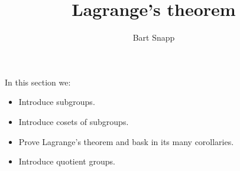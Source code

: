 \documentclass{ximera}
\author{Bart Snapp}
\title{Lagrange's theorem}
\begin{document}
\begin{abstract}
\end{abstract}
\maketitle
In this section we:

\begin{itemize}
\item Introduce subgroups.
\item Introduce cosets of subgroups.
\item Prove Lagrange's theorem and bask in its many corollaries.
\item Introduce quotient groups.
\end{itemize}
\end{document}
